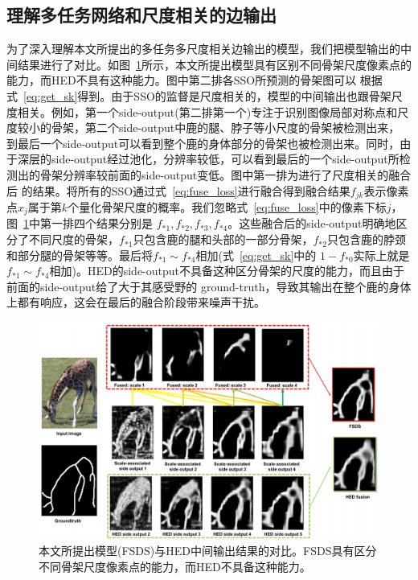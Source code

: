 \documentclass[UTF8]{ctexart}
\numberwithin{equation}{section} %
\numberwithin{table}{section} %
\begin{document}
\subsection{理解多任务网络和尺度相关的边输出}
为了深入理解本文所提出的多任务多尺度相关边输出的模型，我们把模型输出的中间结果进行了对比。如图~\ref{fig:fsds_hed}所示，本文所提出模型具有区别不同骨架尺度像素点的能力，而HED不具有这种能力。图中第二排各SSO所预测的骨架图可以
根据式~\ref{eq:get_sk}得到。由于SSO的监督是尺度相关的，模型的中间输出也跟骨架尺度相关。例如，第一个side-output(第二排第一个)专注于识别图像局部对称点和尺度较小的骨架，第二个side-output中鹿的腿、脖子等小尺度的骨架被检测出来，
到最后一个side-output可以看到整个鹿的身体部分的骨架也被检测出来。同时，由于深层的side-output经过池化，分辨率较低，可以看到最后的一个side-output所检测出的骨架分辨率较前面的side-output变低。图中第一排为进行了尺度相关的融合后
的结果。将所有的SSO通过式~\ref{eq:fuse_loss}进行融合得到融合结果$f_{jk}$表示像素点$x_j$属于第$k$个量化骨架尺度的概率。我们忽略式~\ref{eq:fuse_loss}中的像素下标$j$，图~\ref{fig:fsds_hed}中第一排四个结果分别是
$f_{*1},f_{*2},f_{*3},f_{*4}$。这些融合后的side-output明确地区分了不同尺度的骨架，$f_{*1}$只包含鹿的腿和头部的一部分骨架，$f_{*2}$只包含鹿的脖颈和部分腿的骨架等等。最后将$f_{*1} \sim f_{*4}$相加(式~\ref{eq:get_sk}中的
$1-f_{*0}$实际上就是$f_{*1} \sim f_{*4}$相加)。HED的side-output不具备这种区分骨架的尺度的能力，而且由于前面的side-output给了大于其感受野的 ground-truth，导致其输出在整个鹿的身体上都有响应，这会在最后的融合阶段带来噪声干扰。
\begin{figure}
\centering
\includegraphics[scale=0.3]{figures/lmsds_hed.png}
\caption{本文所提出模型(FSDS)与HED中间输出结果的对比。FSDS具有区分不同骨架尺度像素点的能力，而HED不具备这种能力。}
\label{fig:fsds_hed}
\end{figure}
\end{document}
